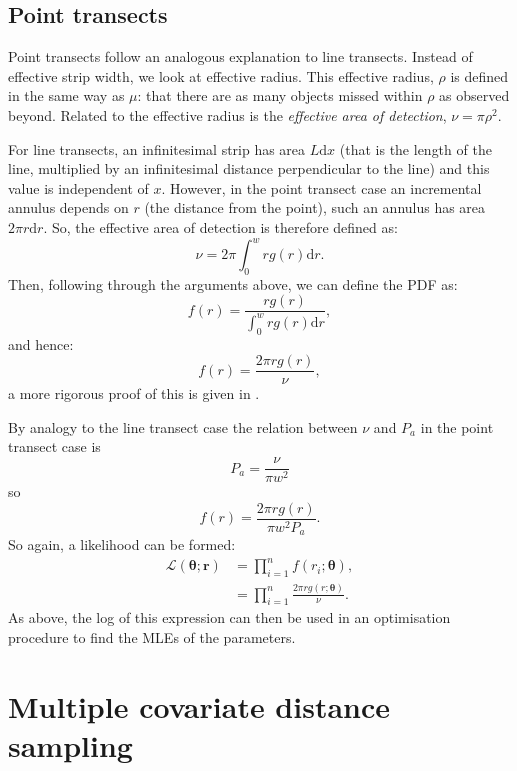 \subsection{Point transects} 

Point transects follow an analogous explanation to line transects. Instead of effective strip width, we look at effective radius. This effective radius, $\rho$ is defined in the same way as $\mu$: that there are as many objects missed within $\rho$ as observed beyond. Related to the effective radius is the \textit{effective area of detection}, $\nu=\pi \rho^2$.

For line transects, an infinitesimal strip has area $L\text{d}x$ (that is the length of the line, multiplied by an infinitesimal distance perpendicular to the line) and this value is independent of $x$. However, in the point transect case an incremental annulus depends on $r$ (the distance from the point), such an annulus has area $2\pi r \text{d}r$. So, the effective area of detection is therefore defined as:
\begin{equation*}
\nu = 2 \pi \int_0^w r g(r) \text{d}r.
\end{equation*}
Then, following through the arguments above, we can define the PDF as:
\begin{equation*}
f(r) = \frac{r g(r)}{\int_0^w r g(r) \text{d}r},
\end{equation*}
and hence: 
\begin{equation*}
f(r) = \frac{2 \pi r g(r)}{\nu},
\end{equation*}
a more rigorous proof of this is given in .

By analogy to the line transect case the relation between $\nu$ and $P_a$ in the point transect case is
\begin{equation*}
P_a=\frac{\nu}{\pi w^2}
\end{equation*}
so
\begin{equation*}
f(r) = \frac{2 \pi r g(r)}{\pi w^2 P_a}.
\end{equation*}
So again, a likelihood can be formed:
\begin{align*}
\mathcal{L}(\bm{\theta}; \bm{r}) &= \prod_{i=1}^n f(r_i;\bm{\theta}),\\
&= \prod_{i=1}^n \frac{2 \pi r g(r;\bm{\theta})}{\nu}.
\end{align*}
As above, the log of this expression can then be used in an optimisation procedure to find the MLEs of the parameters.


\section{Multiple covariate distance sampling}
\label{intro-ds-covar}

